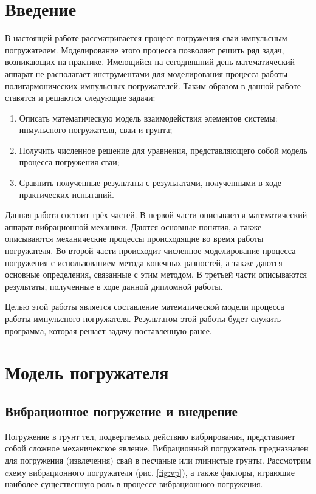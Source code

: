 \section*{Введение}

В настоящей работе рассматривается процесс погружения сваи импульсным погружателем. Моделирование этого процесса позволяет
решить ряд задач, возникающих на практике. Имеющийся на сегодняшний день математический аппарат не располагает инструментами
для моделирования процесса работы полигармонических импульсных погружателей. Таким образом в данной работе ставятся и решаются
следующие задачи:

\begin{enumerate}
    \item Описать математическую модель взаимодействия элементов системы: ипмульсного погружателя, сваи и грунта;
    \item Получить численное решение для уравнения, представляющего собой модель процесса погружения сваи;
    \item Сравнить полученные результаты с результатами, полученными в ходе практических испытаний.
\end{enumerate}

Данная работа состоит трёх частей. В первой части описывается математический аппарат вибрационной механики. Даются основные
понятия, а также описываются механические процессы происходящие во время работы погружателя. Во второй части происходит
численное моделирование процесса погружения с использованием метода конечных разностей, а также даются основные определения,
связанные с этим методом. В третьей части описываются результаты, полученные в ходе данной дипломной работы.

Целью этой работы является составление математической модели процесса работы импульсного погружателя. Результатом этой
работы будет служить программа, которая решает задачу поставленную ранее.

\clearpage

\section{Модель погружателя}

\subsection{Вибрационное погружение и внедрение}

Погружение в грунт тел, подвергаемых действию вибрирования, представляет собой сложное механичекское явление. Вибрационный
погружатель предназначен для погружения (извлечения) свай в песчаные или глинистые грунты. Рассмотрим cхему вибрационного
погружателя (рис. \ref{fig:vp}), а также факторы, играющие наиболее существенную роль в процессе вибрационного погружения.

